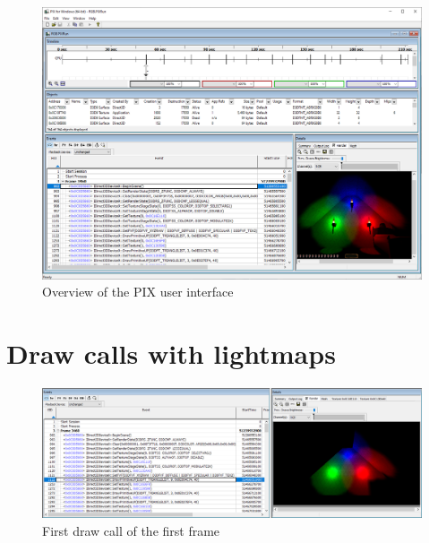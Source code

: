 \begin{appendix}
\begin{figure}[htbp]
	\centering
		\includegraphics[width=1.00\textwidth]{img/PIX/PIX_overview.png}
	\caption[Overview of the PIX user interface]{Overview of the PIX user interface}
	\label{fig:PixOverview}
\end{figure}

\clearpage
{}
\section{Draw calls with lightmaps} 


\begin{figure}[htbp]
	\centering
		\includegraphics[width=1.00\textwidth]{img/PIX/PIX_first_frame_first_draw_call.png}
	\caption[First draw call of the first frame]{First draw call of the first frame}
	\label{fig:PixFirstFrameFirstDrawCall}
\end{figure}

\begin{listing}[htbp]
\begin{verbatim}


\end{verbatim}
\end{listing}
\end{appendix}

